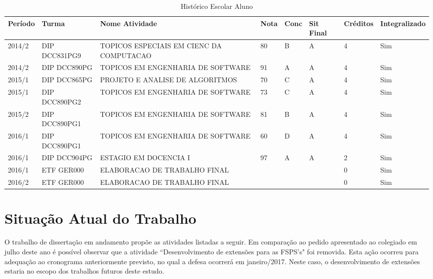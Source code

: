\documentclass[10pt,a4paper]{report}
\begin{document}
\begin{table}[htb]
	\centering
	\begin{tabular}{llllllll}
		\hline
		Período & Turma         & Nome Atividade                           &
		Nota & Conc & Sit Final & Créditos & Integralizado \\ \hline
		2014/2  & DIP DCC831PG9 & TOPICOS ESPECIAIS EM CIENC DA COMPUTACAO & 80
		& B    & A         & 4        & Sim           \\
		2014/2  & DIP DCC890PG  & TOPICOS EM ENGENHARIA DE SOFTWARE        & 91
		& A    & A         & 4        & Sim           \\
		2015/1  & DIP DCC865PG  & PROJETO E ANALISE DE ALGORITMOS          & 70
		& C    & A         & 4        & Sim           \\
		2015/1  & DIP DCC890PG2 & TOPICOS EM ENGENHARIA DE SOFTWARE        & 73
		& C    & A         & 4        & Sim           \\
		2015/2  & DIP DCC890PG1 & TOPICOS EM ENGENHARIA DE SOFTWARE        & 81
		& B    & A         & 4        & Sim           \\
		2016/1  & DIP DCC890PG1 & TOPICOS EM ENGENHARIA DE SOFTWARE        & 60
		& D    & A         & 4        & Sim           \\
		2016/1  & DIP DCC904PG  & ESTAGIO EM DOCENCIA I                    & 97
		& A    & A         & 2        & Sim           \\
		2016/1  & ETF GER000    & ELABORACAO DE TRABALHO FINAL             &
		&      &           & 0        & Sim           \\
		2016/2  & ETF GER000    & ELABORACAO DE TRABALHO FINAL             &
		&      &           & 0        & Sim           \\ \hline
	\end{tabular}
	\caption{Histórico Escolar Aluno}
	\label{tab:historico}
\end{table}

\section{Situação Atual do Trabalho}
\label{situacao-atual}

O trabalho de dissertação em andamento propõe as atividades listadas a seguir.
Em comparação ao pedido apresentado ao colegiado em julho deste ano é possível
observar que a atividade ``Desenvolvimento de extensões para as FSPS's" foi
removida. Esta ação ocorreu para adequação ao cronograma  anteriormente
previsto, no qual a defesa ocorrerá em janeiro/2017. Neste caso, o
desenvolvimento de extensões estaria no escopo dos trabalhos futuros deste
estudo.
\end{document}
